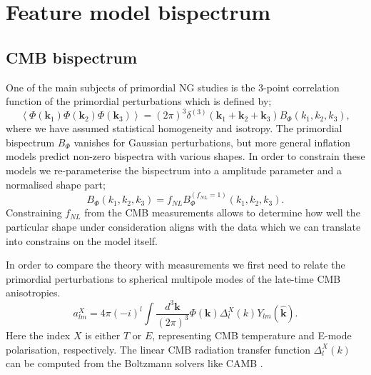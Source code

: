 \section{Feature model bispectrum} \label{section: feature model bispectrum}
\subsection{CMB bispectrum}

One of the main subjects of primordial NG studies is the 3-point correlation function of the primordial perturbations which is defined by;
\begin{equation}
	\left< \Phi(\mathbf{k}_1) \Phi(\mathbf{k}_2) \Phi(\mathbf{k}_3) \right> = (2\pi)^3 \delta^{(3)}(\mathbf{k}_1 + \mathbf{k}_2 + \mathbf{k}_3) B_\Phi (k_1, k_2, k_3),
\end{equation}
where we have assumed statistical homogeneity and isotropy. The primordial bispectrum $B_\Phi$ vanishes for Gaussian perturbations, but more general inflation models predict non-zero bispectra with various shapes.  In order to constrain these models we re-parameterise the bispectrum into a amplitude parameter and a normalised shape part;
\begin{equation}
	B_\Phi (k_1, k_2, k_3) = f_{NL} B_\Phi^{(f_{NL}=1)} (k_1, k_2, k_3).
	\label{fNL definition}
\end{equation}
Constraining $f_{NL}$ from the CMB measurements allows to determine how well the particular shape under consideration aligns with the data which we can translate into constrains on the model itself.

In order to compare the theory with measurements we first need to relate the primordial perturbations to spherical multipole modes of the late-time CMB anisotropies.
\begin{equation}
	a_{lm}^{X} = 4\pi(-i)^l \int \frac{d^3\mathbf{k}}{(2\pi)^3}  \Phi(\mathbf{k}) \Delta_l^X(k) Y_{lm}(\hat{\mathbf{k}}).
	\label{theoretical multiple moments}
\end{equation}
Here the index $X$ is either $T$ or $E$, representing CMB temperature and E-mode polarisation, respectively. The linear CMB radiation transfer function $\Delta_l^X(k)$ can be computed from the Boltzmann solvers like CAMB \cite{Lewis2000}.

